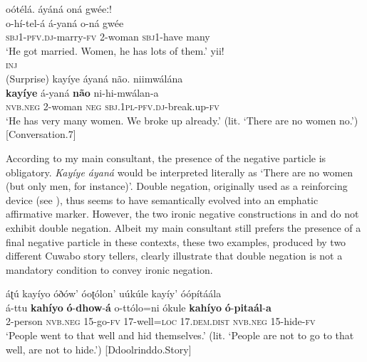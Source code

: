 \documentclass[output=paper,colorlinks=true, citecolor=brown,draftmode]{langscibook}
\begin{document}
\ea\label{ex:cuw:87}
    \begin{xlist}[A: ]
    \label{ex:cuw:87A} oótélá. áyáná oná gwéeː! \\ 
         \gll o-hí-tel-á á-yaná o-ná gwée\\
          \textsc{sbj1-pfv.dj}{}-marry-\textsc{fv} 2-woman \textsc{sbj1}{}-have many \\
    \glt ‘He got married. Women, he has lots of them.’
    \label{ex:cuw:87B}
        \gll yii!\\ 
              \textsc{inj}\\
        \glt (Surprise)
    \label{ex:cuw:87A2} kayíye áyaná não. niimwálána\\ 
         \gll \textbf{kayíye} á-yaná \textbf{não} ni-hi-mwálan-a\\
          \textsc{nvb.neg} 2-woman \textsc{neg} \textsc{sbj.1pl-pfv.dj}{}-break.up-\textsc{fv}\\
        \glt ‘He has very many women. We broke up already.’ (lit. ‘There are no women no.’) [Conversation.7]
    \end{xlist}
\z 

According to my main consultant, the presence of the negative particle is obligatory. \textit{Kayíye áyaná} would be interpreted literally as ‘There are no women (but only men, for instance)’. Double negation, originally used as a reinforcing device (see ), thus seems to have semantically evolved into an emphatic affirmative marker. However, the two ironic negative constructions in  and  do not exhibit double negation. Albeit my main consultant still prefers the presence of a final negative particle in these contexts, these two examples, produced by two different Cuwabo story tellers, clearly illustrate that double negation is not a mandatory condition to convey ironic negation.

\ea\label{ex:cuw:88} áʈú kayíyo óðów’ óoʈólon’ uúkúle kayíy’ óópítáála\\ 
    \gll á-ttu \textbf{kahíyo} \textbf{ó}{}-\textbf{dhow}{}-\textbf{á} o-ttólo=ni ókule \textbf{kahíyo} \textbf{ó}{}-\textbf{pitaál}{}-\textbf{a}\\
          2-person \textsc{nvb.neg} \textsc{15-}go\textsc{{}-fv} 17-well=\textsc{loc} 17.\textsc{dem.dist} \textsc{nvb.neg} \textsc{15-}hide\textsc{{}-fv} \\
    \glt  ‘People went to that well and hid themselves.’  (lit. ‘People are not to go to that well, are not to hide.’) [Ddoolrinddo.Story]
\z 
\end{document}
